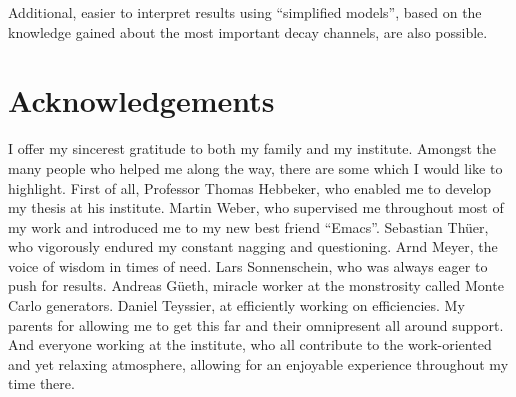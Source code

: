 Additional, easier to interpret results using ``simplified models'', based on the knowledge gained about the most important decay channels, are also possible.

\section*{Acknowledgements} 
\label{sec:acknowledgements}

I offer my sincerest gratitude to both my family and my institute. Amongst the many people who helped me along the way, there are some which I would like to highlight. First of all, Professor Thomas Hebbeker, who enabled me to develop my thesis at his institute. Martin Weber, who supervised me throughout most of my work and introduced me to my new best friend ``Emacs''. Sebastian Th\"uer, who vigorously endured my constant nagging and questioning. Arnd Meyer, the voice of wisdom in times of need. Lars Sonnenschein, who was always eager to push for results. Andreas G\"ueth, miracle worker at the monstrosity called Monte Carlo generators. Daniel Teyssier, at efficiently working on efficiencies. My parents for allowing me to get this far and their omnipresent all around support. And everyone working at the institute, who all contribute to the work-oriented and yet relaxing atmosphere, allowing for an enjoyable experience throughout my time there.


